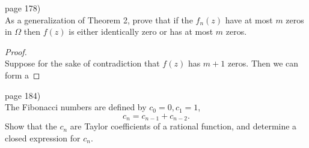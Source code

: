 \documentclass{article}
\newenvironment{problem}[2][Problem]{\begin{trivlist}
\item[\hskip \labelsep {\bfseries #1}\hskip \labelsep {\bfseries #2.}]}{\end{trivlist}}
\begin{document}
\begin{problem}{4} (page 178) \\
  As a generalization of Theorem 2, prove that if the $f_n(z)$ have at most $m$
  zeros in $\Omega$ then $f(z)$ is either identically zero or has at most $m$
  zeros.
\end{problem}
\begin{proof} \text{} \\
  Suppose for the sake of contradiction that $f(z)$ has $m + 1$ zeros. Then we
  can form a
\end{proof}
\pagebreak


\begin{problem}{5} (page 184) \\
  The Fibonacci numbers are defined by $c_0 = 0, c_1 = 1$, \[
    c_{n} = c_{n - 1} + c_{n - 2}.
  \]
  Show that the $c_n$ are Taylor coefficients of a rational function, and
  determine a closed expression for $c_n$.
\end{problem}
\end{document}
